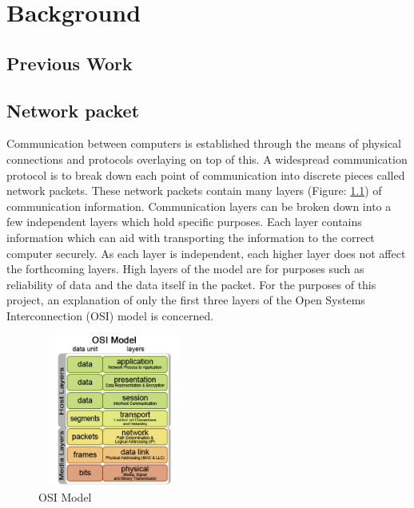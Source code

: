 \chapter{Background}\label{C:back}

\section{Previous Work}

\section{Network packet}

\par Communication between computers is established through the means of physical connections and protocols overlaying on top of this. 
A widespread communication protocol is to break down each point of communication into discrete pieces called network packets.
These network packets contain many layers (Figure: \ref{fig:OSIModel}) of communication information.
Communication layers can be broken down into a few independent layers which hold specific purposes. 
Each layer contains information which can aid with transporting the information to the correct computer securely.
As each layer is independent, each higher layer does not affect the forthcoming layers.
High layers of the model are for purposes such as reliability of data and the data itself in the packet.
For the purposes of this project, an explanation of only the first three layers of the Open Systems Interconnection (OSI) model is concerned.

\begin{figure}[H]
        \begin{center}
                    \includegraphics[width=5cm,height=5cm,keepaspectratio]{Images/OSIModel.png}
                            \caption{OSI Model}
                                    \label{fig:OSIModel}
                                        \end{center}
\end{figure}

